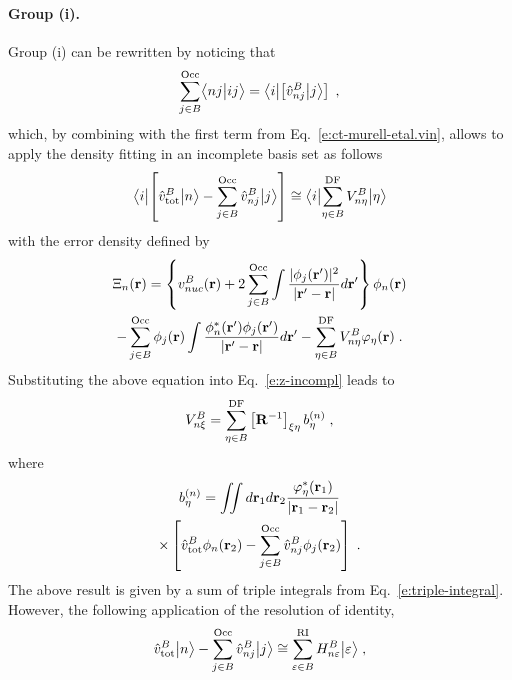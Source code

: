 \paragraph{Group (i).}
Group (i) can be rewritten by noticing that
%
\begin{equation} \label{e:ct-murell-etal.group-i.notice}
 \sum_{j\in B}^{\rm Occ} 
 \BraKet{nj}{ij} =
 \Bra{i} \left[ \hat{v}^B_{nj} \Ket{j} \right]  \;,
\end{equation}
%
which, by combining with the first term from Eq.~\eqref{e:ct-murell-etal.vin}, 
allows to apply the density fitting in an
incomplete basis set as follows
%
\begin{equation}
\Bra{i} \left[ \hat{v}^B_{\rm tot} \Ket{n} - \sum_{j\in B}^{\rm Occ} \hat{v}^B_{nj} \Ket{j} \right]
\cong \Bra{i} \sum_{\eta\in B}^{\rm DF} V^B_{n\eta} \Ket{\eta}
\end{equation}
%
with the error density defined by
%
\begin{multline}
 \Xi_n({\bf r}) = 
  \left\{
      v_{nuc}^B({\bf r}) + 2 \sum_{j\in B}^{\rm Occ}
   \int \frac{ \vert \phi_j({\bf r}') \vert^2 }{\vert {\bf r}' - {\bf r} \vert} d{\bf r}'
  \right\}
  \phi_n({{\bf r}})  \\
 - \sum_{j\in B}^{\rm Occ} \phi_j({{\bf r}})
   \int \frac{ \phi^*_n({\bf r}') \phi_j({{\bf r}'}) }{\vert {\bf r}' - {\bf r} \vert} d{\bf r}'
 - \sum_{\eta\in B}^{\rm DF} V^B_{n\eta} \varphi_\eta({\bf r}) \;.
\end{multline}
%
Substituting the above equation into Eq.~\eqref{e:z-incompl}
leads to
%
\begin{equation}
 V^B_{n\xi} = \sum_{\eta\in B}^{\rm DF} \left[ {\bf R}^{-1} \right]_{\xi\eta} b_\eta^{(n)} \;,
\end{equation}
%
where
%
\begin{multline}
 b^{(n)}_\eta = \iint 
           d{\bf r}_1 d{\bf r}_2  
           \frac{ \varphi^*_\eta({\bf r}_1) }
            {\vert {\bf r}_1 - {\bf r}_2 \vert } \\ \times
          \left[ 
           \hat{v}^B_{\rm tot}  \phi_n({\bf r}_2) 
         - \sum_{j\in B}^{\rm Occ} \hat{v}^B_{nj} \phi_j({{\bf r}_2})
           \right]  \;.
\end{multline}
%
The above result is given by a sum of triple integrals from Eq.~\eqref{e:triple-integral}.
However, the following application of the resolution of identity,
%
\begin{equation}
 \hat{v}^B_{\rm tot} \Ket{n} - \sum_{j\in B}^{\rm Occ} \hat{v}^B_{nj} \Ket{j}
 \cong \sum_{\varepsilon\in B}^{\rm RI} H_{n\varepsilon}^B \Ket{\varepsilon} \;,
\end{equation}
